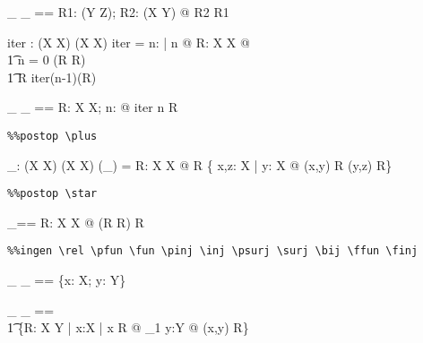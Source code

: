 \documentclass{article}
\begin{document}
\begin{axdef}[X,Y,Z]
   \_ \circ \_ ==
     \lambda R1: \assumed (Y \rel Z); R2: \assumed (X \rel Y) @
       R2 \comp R1
\end{axdef}


\begin{axdef}[X]
  iter : \assumed \nat \fun (X \rel X) \fun (X \rel X) 
\where
  iter = \lambda n: \assumed \nat | n \in \nat @
           \lambda R: \assumed X \rel X @ \\\t1
               \IF n = 0 \THEN \id (\dom R \cup \ran R) \\\t1
               \ELSE R \comp iter(n-1)(R)
\end{axdef}


\begin{axdef}[X]
  \_ \bsup \_ \esup == \lambda R: \assumed X \rel X; n: \assumed \nat @ 
        iter n R
\end{axdef}

\begin{verbatim}
%%postop \plus
\end{verbatim}

\begin{axdef}[X]
 \_\plus : \assumed (X \rel X) \fun (X \rel X)
\where
  (\_\plus) = \lambda R: \assumed X \rel X @ 
     R \cup
     \{ x,z: \assumed X | \exists y: \assumed X @
                            (x,y) \in R \land (y,z) \in R\plus \}
\end{axdef}

\begin{verbatim}
%%postop \star
\end{verbatim}

\begin{axdef}[X]
 \_\star == 
   \lambda R: \assumed X \rel X @ \id (\dom R \cup \ran R) \cup R\plus 
\end{axdef}



\begin{verbatim}
%%ingen \rel \pfun \fun \pinj \inj \psurj \surj \bij \ffun \finj
\end{verbatim}

\begin{axdef}[X,Y]
  \_ \rel \_ == \power \{x: X; y: Y\}
\end{axdef}

\begin{axdef}[X,Y]
  \_ \pfun \_ ==  \\\t1
    \{R: \assumed X \rel Y | 
         \forall x:X | x \in \dom R @ \exists_1 y:Y @ (x,y) \in R\}
\end{axdef}
\end{document}
